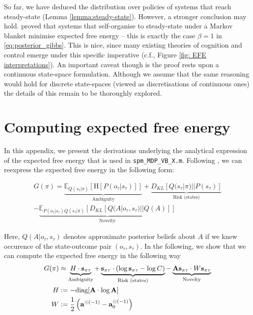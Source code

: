 \documentclass[review,12pt,authoryear]{elsarticle}
\begin{document}
So far, we have deduced the distribution over policies of systems that reach steady-state (Lemma \ref{lemma:steady-state}). However, a stronger conclusion may hold. \cite{parrMarkovBlanketsInformation2019,fristonFreeEnergyPrinciple2019} proved that systems that self-organise to steady-state under a Markov blanket minimise expected free energy -- this is exactly the case $\beta =1$ in \eqref{eq:posterior_gibbs}. This is nice, since many existing theories of cognition and control emerge under this specific imperative (c.f., Figure \ref{fig: EFE interpretations}). An important caveat though is the proof rests upon a continuous state-space formulation. Although we assume that the same reasoning would hold for discrete state-spaces (viewed as discretisations of continuous ones) the details of this remain to be thoroughly explored.

\section{Computing expected free energy}
	
	In this appendix, we present the derivations underlying the analytical expression of the expected free energy that is used in \texttt{spm\_MDP\_VB\_X.m}. Following \citep{parrComputationalNeurologyActive2019}, we can reexpress the expected free energy in the following form:
	
	\begin{multline}
	\label{eq: G new expression}
		G(\pi)= \underbrace{\mathbb E_{Q(s_\tau|\pi)} [\text{H}[P(o_\tau |s_\tau)]]}_{\text{Ambiguity}} + \underbrace{D_{KL}[Q(s_\tau |\pi)||P(s_\tau)]}_{\text{Risk (states)}}  \\
		- \underbrace{\mathbb E_{P(o_\tau |s_\tau)Q(s_\tau|\pi)}[D_{KL}[Q(A|o_\tau,s_\tau)||Q(A)]]}_{\text{Novelty}}
	\end{multline}
	
	 Here, $Q(A|o_\tau,s_\tau)$ denotes approximate posterior beliefs about $A$ if we knew occurence of the state-outcome pair $(o_\tau,s_\tau)$. In the following, we show that we can compute the expected free energy in the following way
	 \begin{equation}
	 \label{eq: sol efe computation}
	     \begin{split}
	         G(\pi) &\approx \underbrace{H \cdot \bold s_{\pi \tau}}_{\text{Ambiguity}} + \underbrace{ \bold s_{\pi \tau} \cdot (\log \bold s_{\pi \tau}-\log C)}_{\text{Risk (states)}} - \underbrace{\bold A \bold s_{\pi \tau} \cdot W \bold s_{\pi \tau}}_{\text{Novelty}} \\
             H &:= - \text{diag} [\bold A\cdot \log \bold A] \\
             W &:= \frac 1 2 \left(\bold a ^{\odot (-1)}-\bold a_0^{\odot (-1)}\right)
	     \end{split}
	 \end{equation}
    
\end{document}
